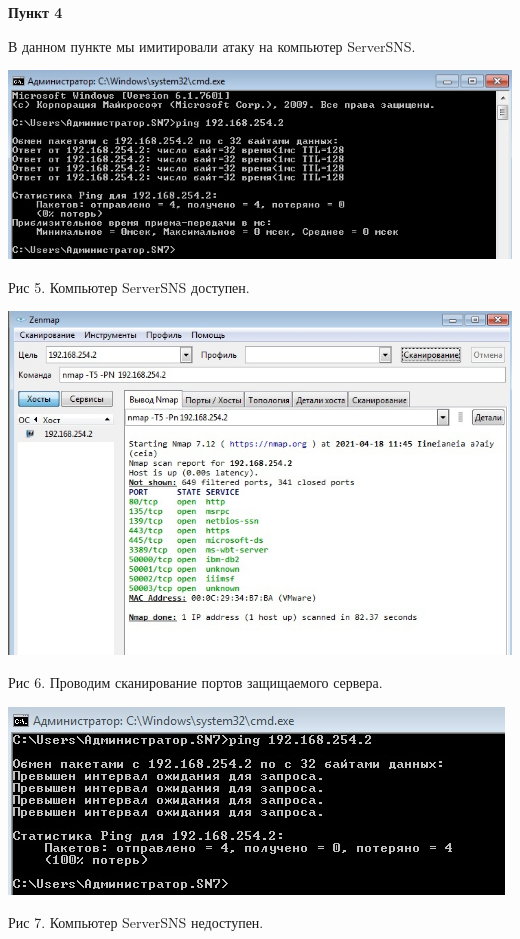 \documentclass[a4paper,14pt]{extarticle}
\begin{document}
    \textbf{Пункт 4}
    \vspace{-3ex}
    \begin{center}
        \singlespacing
        В данном пункте мы имитировали атаку на компьютер ServerSNS.

        \includegraphics[scale=0.6]{pics/4_1.jpg}
        
        Рис 5. Компьютер ServerSNS доступен.

        \includegraphics[scale=0.6]{pics/4_2.jpg}

        Рис 6. Проводим сканирование портов защищаемого сервера.

        \includegraphics[scale=0.7]{pics/4_3.jpg}

        Рис 7. Компьютер ServerSNS недоступен.

    \end{center}
\end{document}
